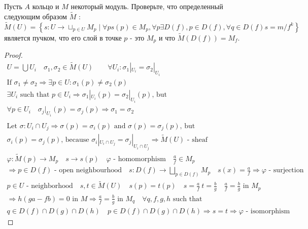 \begin{comment}
https://math.stackexchange.com/questions/10136/monomorphisms-of-sheaves-gives-an-injection-of-stalks
https://ocw.mit.edu/courses/18-726-algebraic-geometry-spring-2009/pages/lecture-notes/
https://stacks.math.columbia.edu/tag/00WL
\end{comment}
\vskip 0.6in






\begin{prob}
Пусть $A$ кольцо и $M$ некоторый модуль. Проверьте, что определенный следующим образом $\tilde{M}$ :
$$
\tilde{M}(U)=\left\{s: U \rightarrow \sqcup_{p \in U} M_p \mid \forall p s(p) \in M_p, \forall p \exists D(f), p \in D(f), \forall q \in D(f) s=m / f^k\right\}
$$
является пучком, что его слой в точке $p$ - это $M_p$ и что $\tilde{M}(D(f))=M_f$.
\end{prob}
\begin{proof}
\begin{gather*}
U = \bigcup U_i\quad \sigma_1, \sigma_2 \in \tilde{M}(U)\qquad \forall U_i: \sigma_1|_{U_i} = \sigma_2|_{U_i}\\
\text{If } \sigma_1 \neq \sigma_2 \Rightarrow \exists p \in U: \sigma_1(p) \neq \sigma_2(p)\\
\exists U_i \text{ such that } p \in U_i \Rightarrow \sigma_1|_{U_i}(p) = \sigma_2|_{U_i}(p) \text{, but}\\
\forall p \in U_i\quad \sigma_j|_{U_i}(p) = \sigma_j(p) \Rightarrow \sigma_1 = \sigma_2\\
\\
\text{Let } \sigma: U_i \cap U_j \Rightarrow \sigma(p) = \sigma_i(p) \text{ and } \sigma(p) = \sigma_j(p) \text{, but}\\
\sigma_i(p) = \sigma_j(p) \text{, because } \sigma_i|_{U_i \cap U_j} = \sigma_j|_{U_i \cap U_j} \Rightarrow \tilde{M}(U) \text{ - sheaf}\\
\varphi: \tilde{M}(p) \to M_p\quad s \to s(p)\quad \varphi \text{ - homomorphism}\quad \frac{a}{f} \in M_p\\
\Rightarrow p \in D(f) \text{ - open neighbourhood}\quad s: D(f) \to \bigsqcup_{p \in D(f)} M_p\quad s(x) = \frac{a}{f}
\Rightarrow \varphi \text{ - surjection}\\
p \in U \text{ - neighborhood}\quad s,t \in \tilde{M}(U)\quad s(p) = t(p)\quad s = \frac{a}{f}\ t = \frac{b}{g}\quad \frac{a}{f}=\frac{b}{g} \text{ in } M_p\\
\Rightarrow h(ga - fb) = 0 \text{ in } M
\Rightarrow \frac{a}{f} = \frac{b}{g} \text{ in } M_q\quad \forall q,f,g,h \text{ such that}\\
q \in D(f) \cap D(g) \cap D(h)\quad p \in D(f) \cap D(g) \cap D(h)
\Rightarrow s=t
\Rightarrow \varphi \text{ - isomorphism}
\end{gather*}
\end{proof}
\begin{comment}
https://www.math.utah.edu/~bertram/7800/Coherent.pdf
https://direct.mit.edu/books/oa-monograph/5460/Sheaf-Theory-through-Examples
\end{comment}
\vskip 0.6in






